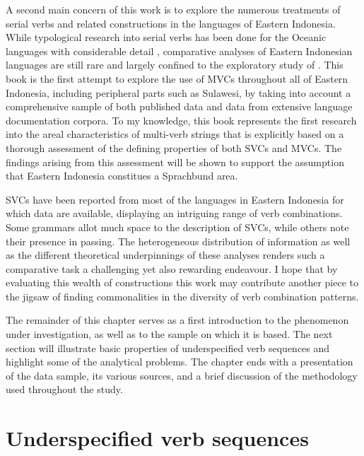 A second main concern of this work is to explore the numerous treatments of serial verbs and related constructions in the languages of Eastern Indonesia. While typological research into serial verbs has been done for the Oceanic languages with considerable detail \citep{crowley2002serial, bril2004complex, bril2007nexus}, comparative analyses of Eastern Indonesian languages are still rare and largely confined to the exploratory study of \citet{vanstaden2008serial}. This book is the first attempt to explore the use of MVCs throughout all of Eastern Indonesia, including peripheral parts such as Sulawesi, by taking into account a comprehensive sample of both published data and data from extensive language documentation corpora. To my knowledge, this book represents the first research into the areal characteristics of multi-verb strings that is explicitly based on a thorough assessment of the defining properties of both SVCs and MVCs. The findings arising from this assessment will be shown to support the assumption that Eastern Indonesia constitues a Sprachbund area.

SVCs have been reported from most of the languages in Eastern Indonesia for which data are available, displaying an intriguing range of verb combinations. Some grammars allot much space to the description of SVCs, while others note their presence in passing. The heterogeneous distribution of information as well as the different theoretical underpinnings of these analyses renders such a comparative task a challenging yet also rewarding endeavour. I hope that by evaluating this wealth of constructions this work may contribute another piece to the jigsaw of finding commonalities in the diversity of verb combination patterns.

The remainder of this chapter serves as a first introduction to the phenomenon under investigation, as well as to the sample on which it is based. The next section will illustrate basic properties of underspecified verb sequences and highlight some of the analytical problems. The chapter ends with a presentation of the data sample, its various sources, and a brief discussion of the methodology used throughout the study.

\section{Underspecified verb sequences}\label{underspecified}

